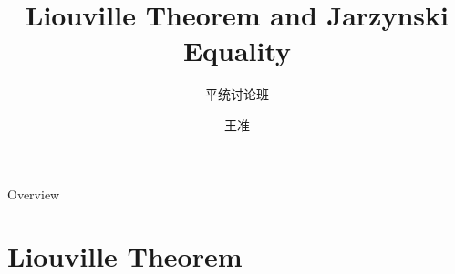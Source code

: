 \documentclass[aspectratio=169]{wzbeamer}
\title{Liouville Theorem and Jarzynski Equality}
\subtitle{平统讨论班}
\author{王准}
\institute[pku]{北京大学}
\begin{document}
\maketitle 
    
\begin{frame}{Overview}
    \tableofcontents
\end{frame}

\section{Liouville Theorem}
    \begin{frame}{}
        
    \end{frame}
\end{document}

